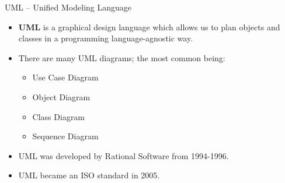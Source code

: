 \documentclass[]{beamer}
\begin{document}
\begin{frame}{UML -- Unified Modeling Language}
    \begin{itemize}[<+->]
        \item \textbf{UML} is a graphical design language which allows
            us to plan objects and classes in a programming 
            language-agnostic way.
        \item There are many UML diagrams; the most common being:
        \begin{itemize}
            \item Use Case Diagram
            \item Object Diagram
            \item Class Diagram
            \item Sequence Diagram
        \end{itemize}
        \item UML was developed by Rational Software from 1994-1996.
        \item UML became an ISO standard in 2005.
    \end{itemize}
\end{frame}
\end{document}

